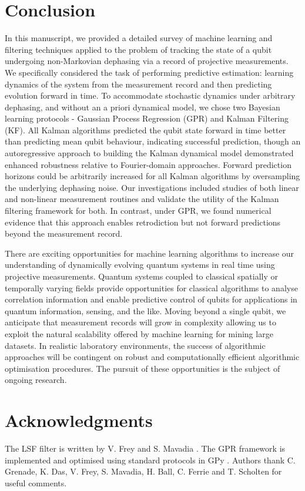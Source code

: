 \section{Conclusion \label{sec:main:Conclusion}}

In this manuscript, we provided a detailed survey of machine learning and filtering techniques applied to the problem of tracking the state of a qubit undergoing non-Markovian dephasing via a record of projective measurements.  We specifically considered the task of performing predictive estimation: learning dynamics of the system from the measurement record and then predicting evolution forward in time. To accommodate stochastic dynamics under arbitrary dephasing, and without an a priori dynamical model, we chose two Bayesian learning protocols - Gaussian Process Regression (GPR) and Kalman Filtering (KF).  All Kalman algorithms predicted the qubit state forward in time better than predicting mean qubit behaviour, indicating successful prediction, though an autoregressive approach to building the Kalman dynamical model demonstrated enhanced robustness relative to Fourier-domain approaches.  Forward prediction horizons could be arbitrarily increased for all Kalman algorithms by oversampling the underlying dephasing noise.  Our investigations included studies of both linear and non-linear measurement routines and validate the utility of the Kalman filtering framework for both.  In contrast, under GPR, we found numerical evidence that this approach enables retrodiction but not forward predictions beyond the measurement record.  

There are exciting opportunities for machine learning algorithms to increase our understanding of dynamically evolving quantum systems in real time using projective measurements. Quantum systems coupled to classical spatially or temporally varying fields provide opportunities for classical algorithms to analyse correlation information and enable predictive control of qubits for applications in quantum information, sensing, and the like. Moving beyond a single qubit, we anticipate that measurement records will grow in complexity allowing us to exploit the natural scalability offered by machine learning for mining large datasets. In realistic laboratory environments, the success of algorithmic approaches will be contingent on robust and computationally efficient algorithmic optimisation procedures. The pursuit of these opportunities is the subject of ongoing research.

\section{Acknowledgments}
 The LSF filter is written by V. Frey and S. Mavadia \cite{mavadia2017}. The GPR framework is implemented and optimised using standard protocols in GPy \cite{gpy2014}. Authors thank C. Grenade, K. Das, V. Frey, S. Mavadia, H. Ball, C. Ferrie and T. Scholten for useful comments. 
 



